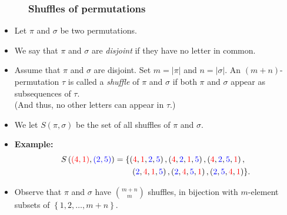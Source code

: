 \documentclass{beamer}
\newcommand{\red}{\color{red}}
\newcommand{\blue}{\color{blue}}
\newcommand{\fti}[1]{\frametitle{\ \ \ \ \ #1}}
\newcommand{\set}[1]{\left\{ #1 \right\}}
\newcommand{\abs}[1]{\left| #1 \right|}
\newcommand{\tup}[1]{\left( #1 \right)}
\newcommand{\defn}[1]{{\color{darkred}\emph{#1}}} %
\theoremstyle{plain}
\begin{document}
\begin{frame}
\fti{Shuffles of permutations}

\begin{itemize}

\item Let $\pi$ and $\sigma$ be two permutations.

\item We say that $\pi$ and $\sigma$ are \defn{disjoint} if they have
      no letter in common.

\pause

\item Assume that $\pi$ and $\sigma$ are disjoint. Set
      $m = \abs{\pi}$ and $n = \abs{\sigma}$.
      An $\tup{m+n}$-permutation $\tau$ is called a \defn{shuffle} of
      $\pi$ and $\sigma$ if both $\pi$ and $\sigma$ appear as
      subsequences of $\tau$. \\
      (And thus, no other letters can appear in $\tau$.)

\item We let $S \tup{\pi, \sigma}$ be the set of all shuffles
      of $\pi$ and $\sigma$.

\item \textbf{Example:}
      \begin{align*}
      S \tup{ {\red \tup{4, 1}} , {\blue \tup{2, 5}} }
      &= \{ \tup{ {\red 4}, {\red 1}, {\blue 2}, {\blue 5} } ,
            \tup{ {\red 4}, {\blue 2}, {\red 1}, {\blue 5} } ,
            \tup{ {\red 4}, {\blue 2}, {\blue 5}, {\red 1} } , \\
      & \qquad
            \tup{ {\blue 2}, {\red 4}, {\red 1}, {\blue 5} } ,
            \tup{ {\blue 2}, {\red 4}, {\blue 5}, {\red 1} } ,
            \tup{ {\blue 2}, {\blue 5}, {\red 4}, {\red 1} }  \} .
      \end{align*}

\pause

\item Observe that $\pi$ and $\sigma$ have $\binom{m+n}{m}$
      shuffles, in bijection with $m$-element subsets of
      $\set{1, 2, \ldots, m+n}$.

\end{itemize}
\end{frame}
\end{document}

